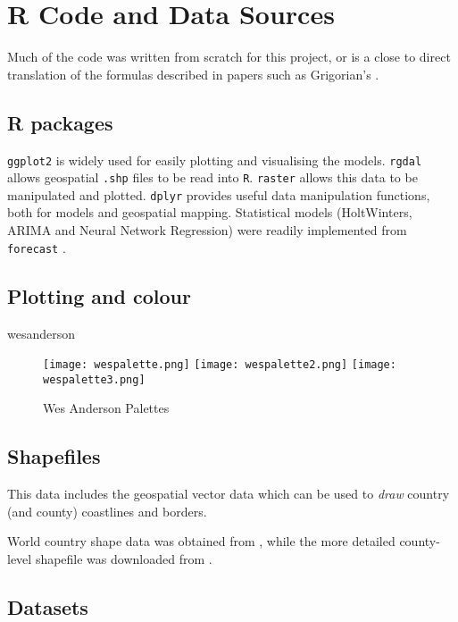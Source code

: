 \section{R Code and Data Sources}
\label{ch:codesource}

Much of the code was written from scratch for this project, or is a close to direct translation of the formulas described in papers such as Grigorian's \cite{grigor20}.

\subsection{R packages}

\verb|ggplot2|  \cite{ggplot2} is widely used for easily plotting and visualising the models. \verb|rgdal| \cite{rgdal} allows geospatial \verb|.shp| files to be read into \verb|R|. \verb|raster| \cite{raster} allows this data to be manipulated and plotted. \verb|dplyr| \cite{dplyr}  provides useful data manipulation functions, both for models and geospatial mapping. Statistical models (HoltWinters, ARIMA and Neural Network Regression) were readily implemented from \verb|forecast| \cite{forecasting}.

\subsection{Plotting and colour}

wesanderson \cite{wesanderson20}

\begin{figure}[!htb]
  \texttt{[image: wespalette.png]} \label{fig:wespalette}
  \texttt{[image: wespalette2.png]} \label{fig:wespalette2}
  \texttt{[image: wespalette3.png]} \label{fig:wespalette3}
\endminipage
\caption{Wes Anderson Palettes}
\end{figure}


\subsection{Shapefiles}

This data includes the geospatial vector data which can be used to \textit{draw} country (and county) coastlines and borders. 

World country shape data was obtained from \cite{countryshape}, while the more detailed county-level shapefile was downloaded from \cite{countyshape}.

\subsection{Datasets}

